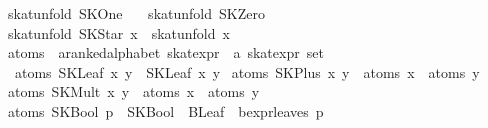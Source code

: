 \begin{isabellebody}
{}\ {}skat{}unfold\ SKOne\ {}\ {}{}\isanewline
{}\ {}skat{}unfold\ SKZero\ {}\ {}{}\isanewline
{}\ {}skat{}unfold\ {}SKStar\ x{}\ {}\ {}skat{}unfold\ x{}\isanewline
\isanewline
{}\isamarkupfalse%
\ atoms\ {}{}\ {}{}a{}{}ranked{}alphabet\ skat{}expr\ {}\ {}a\ skat{}expr\ set{}\ \isanewline
\ \ {}atoms\ {}SKLeaf\ x\ y{}\ {}\ {}SKLeaf\ x\ y{}{}\isanewline
{}\ {}atoms\ {}SKPlus\ x\ y{}\ {}\ atoms\ x\ {}\ atoms\ y{}\isanewline
{}\ {}atoms\ {}SKMult\ x\ y{}\ {}\ atoms\ x\ {}\ atoms\ y{}\isanewline
{}\ {}atoms\ {}SKBool\ p{}\ {}\ SKBool\ {}\ BLeaf\ {}\ bexpr{}leaves\ p{}\isanewline

\end{isabellebody}
